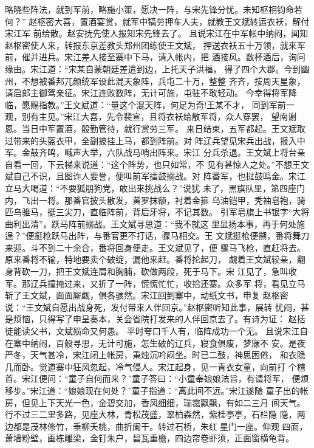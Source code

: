 略晓些阵法，就到军前，略施小策，愿决一阵，与宋先锋分忧。未知枢相钧命若何？”
赵枢密大喜，置酒宴赏，就军中犒劳押车人夫，就教王文斌转运衣袄，解付宋江军
前给散。赵安抚先使人报知宋先锋去了。
且说宋江在中军帐中纳闷，闻知赵枢密使人来，转报东京差教头郑州团练使王文斌，
押送衣袄五十万领，就来军前，催并进兵。宋江差人接至寨中下马，请入帐内，把
酒接风。数杯酒后，询问缘由。宋江道：“宋某自蒙朝廷差遣到边，上托天子洪福，
得了四个大郡。今到幽州，不想被番邦兀颜统军设此混天象阵，兵屯二十万，整整
齐齐，按周天星象，请启郎主御驾亲征。宋江连败数阵，无计可施，屯驻不敢轻动。
今幸得将军降临，愿赐指教。”王文斌道：“量这个混天阵，何足为奇!王某不才，
同到军前一观，别有主见。”宋江大喜，先令裴宣，且将衣袄给散军将，众人穿罢，
望南谢恩。当日中军置酒，殷勤管待，就行赏劳三军。
来日结束，五军都起。王文斌取过带来的头盔衣甲，全副披挂上马，都到阵前。对
阵辽兵望见宋兵出战，报入中军。金鼓齐鸣，喊声大举，六队战马哨出阵来。宋江
分兵杀退。王文斌上将台亲自看一回，下云梯来说道：“这个阵势，也只如常，不
见有甚惊人之处。”不想王文斌自己不识，且图诈人要誉，便叫前军擂鼓搦战。对
阵番军，也挝鼓鸣金。宋江立马大喝道：“不要狐朋狗党，敢出来挑战么？”说犹
未了，黑旗队里，第四座门内，飞出一将。那番官披头散发，黄罗抹额，衬着金箍
乌油铠甲，秃袖皂袍，骑匹乌骓马，挺三尖刀，直临阵前，背后牙将，不记其数。
引军皂旗上书银字“大将曲利出清”，跃马阵前搦战。王文斌寻思道：“我不就这
里显扬本事，再于何处施逞？”便挺枪跃马出阵，与番官更不打话，骤马相交。王
文斌挺枪便搠，番将舞刀来迎。斗不到二十余合，番将回身便走。王文斌见了，便
骤马飞枪，直赶将去。原来番将不输，特地要卖个破绽，漏他来赶。番将抡起刀，
觑着王文斌较亲，翻身背砍一刀，把王文斌连肩和胸脯，砍做两段，死于马下。宋
江见了，急叫收军。那辽兵撞掩过来，又折了一阵，慌慌忙忙，收拾还寨。众多军
将，看见立马斩了王文斌，面面厮觑，俱各骇然。宋江回到寨中，动纸文书，申复
赵枢密说：“王文斌自愿出战身死，发付带来人伴回京。”赵枢密听知此事，展转
忧闷，甚是烦恼，只得写了申呈奏本，关会省院打发来的人伴回京去了。有诗为证：
赵括徒能读父书，文斌殒命又何愚。
平时夸口千人有，临阵成功一个无。
且说宋江自在寨中纳闷，百般寻思，无计可施，怎生破的辽兵，寝食俱废，梦寐不
安。是夜严冬，天气甚冷，宋江闭上帐房，秉烛沉吟闷坐。时已二鼓，神思困倦，
和衣隐几而卧。觉道寨中狂风忽起，冷气侵人。宋江起身，见一青衣女童，向前打
个稽首。宋江便问：“童子自何而来？”童子答曰：“小童奉娘娘法旨，有请将军，
便烦移步。”宋江道：“娘娘现在何处？”童子指道：“离此间不远。”宋江遂随
童子出的帐房，但见上下天光一色，金碧交加，香风细细，瑞霭飘飘，有如二三月
间天气。行不过三二里多路，见座大林，青松茂盛，翠柏森然，紫桂亭亭，石栏隐
隐，两边都是茂林修竹，垂柳夭桃，曲折阑干。转过石桥，朱红星门一座。仰观
四面，萧墙粉壁，画栋雕梁，金钉朱户，碧瓦重檐，四边帘卷虾须，正面窗横龟背。
